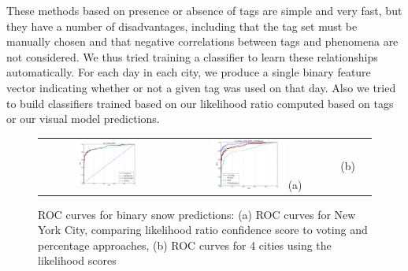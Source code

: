 These methods based on presence or absence of tags are simple and very
fast, but they have a number of disadvantages, including that the tag
set must be manually chosen and that negative correlations between
tags and phenomena are not considered.
We thus tried training a classifier to learn these relationships automatically.
For each day in each city, we produce a single binary feature vector indicating whether 
or not a given tag was used on that day. Also we tried to build classifiers trained based on our likelihood ratio computed based on tags or our visual model predictions. 








\begin{figure}
\hspace{-0.25in}
\small{
\begin{tabular}{@{}c@{}c@{}c@{}c@{}}
\includegraphics[width=0.50\textwidth,clip,trim=0.4in 0 0.8in 0]{plots/nyc_snow_ROC.png} &
\includegraphics[width=0.50\textwidth,clip,trim=0.4in 0 0.8in 0]{plots/city_cmp_snow_ROC.png} 
(a) & (b)  
\end{tabular}
}
\vspace{-6pt}
\caption{ROC curves for binary snow predictions: (a) ROC curves for New York City, comparing likelihood
ratio confidence score to voting and percentage approaches, (b) ROC curves for 4 cities using the likelihood
scores}
\label{fig:city_roc}
\vspace{-6pt}
\end{figure}









